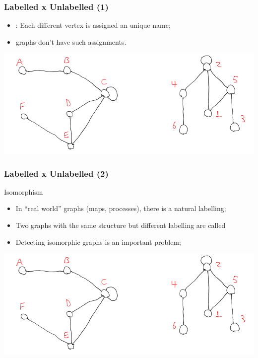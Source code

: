 \documentclass{beamer}
\begin{document}
\begin{frame}
  \frametitle{Labelled x Unlabelled (1)}
  \begin{itemize}
  \item {}: Each different vertex is assigned an unique name;
  \item {} graphs don't have such assignments.
  \end{itemize}
  \begin{center}
    \includegraphics[height=0.45\textheight]{labelled}
  \end{center}
\end{frame}

\begin{frame}
  \frametitle{Labelled x Unlabelled (2)}
  \begin{block}{Isomorphism}
  \begin{itemize}
  \item In ``real world'' graphs (maps, processes), there is a natural labelling;
  \item Two graphs with the same structure but different labelling are
    called 
  \item Detecting isomorphic graphs is an important problem;
  \end{itemize}
  \end{block}
  \begin{center}
    \includegraphics[height=0.45\textheight]{labelled}
  \end{center}
\end{frame}
\end{document}
